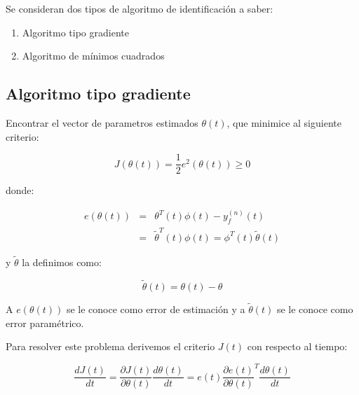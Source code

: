         Se consideran dos tipos de algoritmo de identificación a saber:

        \begin{enumerate}
            \item Algoritmo tipo gradiente
            \item Algoritmo de mínimos cuadrados
        \end{enumerate}


        \subsection{Algoritmo tipo gradiente}

            \begin{problema}
                Encontrar el vector de parametros estimados $\theta(t)$, que minimice al siguiente criterio:

                \begin{equation}
                    J \left( \theta(t) \right) = \frac{1}{2} e^2 \left( \theta(t) \right) \ge 0
                \end{equation}

                donde:

                \begin{eqnarray}
                    e \left( \theta(t) \right) & = & \theta^T(t) \phi(t) - y_f^{(n)}(t) \nonumber \\
                    & = & \tilde{\theta}^T(t) \phi(t) = \phi^T(t) \tilde{\theta}(t)
                \end{eqnarray}

                y $\tilde{\theta}$ la definimos como:

                \begin{equation}
                    \tilde{\theta}(t) = \theta(t) - \theta
                \end{equation}

                A $e \left( \theta(t) \right)$ se le conoce como error de estimación y a $\tilde{\theta}(t)$ se le conoce como error paramétrico.
            \end{problema}

            Para resolver este problema derivemos el criterio $J(t)$ con respecto al tiempo:

            \begin{equation} \label{eq:adap6}
                \frac{d J(t)}{dt} = \frac{\partial J(t)}{\partial \theta(t)} \frac{d \theta(t)}{dt} = e(t) \frac{\partial e(t)}{\partial \theta(t)}^T \frac{d \theta(t)}{dt}
            \end{equation}

